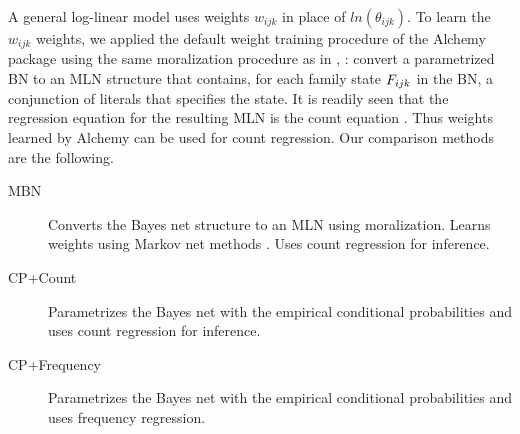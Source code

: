\documentclass{article}
\begin{document}
A general log-linear model uses weights $w_{ijk}$ in place of $ln(\theta_{ijk})$.
To learn the $w_{ijk}$ weights, we applied the default weight training procedure of the Alchemy package \cite{Kok2009a} using the same moralization procedure as in \cite[12.5.3]{Domingos2007}, \cite{Schulte2012}: convert a parametrized BN to an MLN structure that contains,  for each family state $F_{ijk}$ in the BN, a conjunction of literals that specifies the state. It is readily seen that the regression equation for the resulting MLN is the count equation \cite{Schulte2011}. Thus weights learned by Alchemy can be used for count regression. Our comparison methods are the following.
%

\begin{description}
\item[MBN] Converts the Bayes net structure to an MLN using moralization. Learns weights using Markov net methods \cite{Lowd2007}. Uses count regression for inference.
\item[CP+Count]  Parametrizes the Bayes net with the empirical conditional probabilities and uses count regression for inference.
\item[CP+Frequency]  Parametrizes the Bayes net with the empirical conditional probabilities and uses frequency regression.
\end{description}
\end{document}

